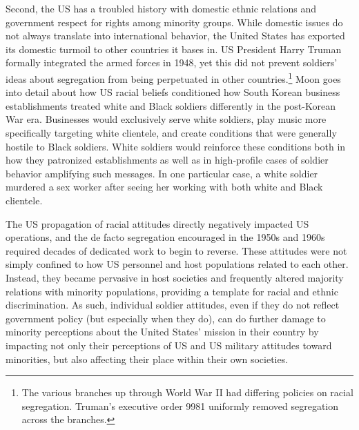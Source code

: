 Second, the US has a troubled history with domestic ethnic relations and government respect for rights among minority groups. While domestic issues do not always translate into international behavior, the United States has exported its domestic turmoil to other countries it bases in. US President Harry Truman formally integrated the armed forces in 1948, yet this did not prevent soldiers' ideas about segregation from being perpetuated in other countries.\footnote{The various branches up through World War II had differing policies on racial segregation. Truman's executive order 9981 uniformly removed segregation across the branches.}  Moon goes into detail about how US racial beliefs conditioned how South Korean business establishments treated white and Black soldiers differently in the post-Korean War era.\cite{Moon1997} Businesses would exclusively serve white soldiers, play music more specifically targeting white clientele, and create conditions that were generally hostile to Black soldiers. White soldiers would reinforce these conditions both in how they patronized establishments as well as in high-profile cases of soldier behavior amplifying such messages. In one particular case, a white soldier murdered a sex worker after seeing her working with both white and Black clientele.\cite{Moon1997} 

The US propagation of racial attitudes directly negatively impacted US operations, and the de facto segregation encouraged in the 1950s and 1960s required decades of dedicated work to begin to reverse. These attitudes were not simply confined to how US personnel and host populations related to each other. Instead, they became pervasive in host societies and frequently altered majority relations with minority populations, providing a template for racial and ethnic discrimination. As such, individual soldier attitudes, even if they do not reflect government policy (but especially when they do), can do further damage to minority perceptions about the United States' mission in their country by impacting not only their perceptions of US and US military attitudes toward minorities, but also affecting their place within their own societies. 

